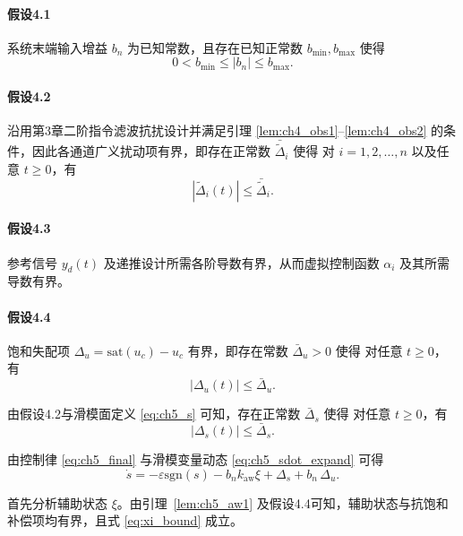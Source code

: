 \paragraph{假设4.1}
系统末端输入增益 $b_n$ 为已知常数，且存在已知正常数 $b_{\min},b_{\max}$ 使得
\begin{equation}
0<b_{\min}\le |b_n|\le b_{\max}.
\end{equation}

\paragraph{假设4.2}
沿用第3章二阶指令滤波抗扰设计并满足引理 \ref{lem:ch4_obs1}--\ref{lem:ch4_obs2} 的条件，因此各通道广义扰动项有界，即存在正常数 $\bar{\tilde\Delta}_i$ 使得
对 $i=1,2,\ldots,n$ 以及任意 $t\ge 0$，有
\begin{equation}
|\tilde\Delta_i(t)|\le \bar{\tilde\Delta}_i.
\end{equation}

\paragraph{假设4.3}
参考信号 $y_d(t)$ 及递推设计所需各阶导数有界，从而虚拟控制函数 $\alpha_i$ 及其所需导数有界。

\paragraph{假设4.4}
饱和失配项 $\Delta_u=\mathrm{sat}(u_c)-u_c$ 有界，即存在常数 $\bar\Delta_u>0$ 使得
对任意 $t\ge 0$，有
\begin{equation}
|\Delta_u(t)|\le \bar\Delta_u.
\end{equation}

由假设4.2与滑模面定义 \eqref{eq:ch5_s} 可知，存在正常数 $\bar\Delta_s$ 使得
对任意 $t\ge 0$，有
\begin{equation}\label{eq:ch5_Deltas_bound}
  |\Delta_s(t)|\le \bar\Delta_s.
\end{equation}

由控制律 \eqref{eq:ch5_final} 与滑模变量动态 \eqref{eq:ch5_sdot_expand} 可得
\begin{equation}\label{eq:ch5_sdot_closed_new}
  \dot s
  = -\varepsilon\mathrm{sgn}(s)
    -b_nk_{\mathrm{aw}}\xi
    + \Delta_s
    + b_n\,\Delta_u.
\end{equation}

首先分析辅助状态 $\xi$。由引理~\ref{lem:ch5_aw1} 及假设4.4可知，辅助状态与抗饱和补偿项均有界，且式 \eqref{eq:xi_bound} 成立。

